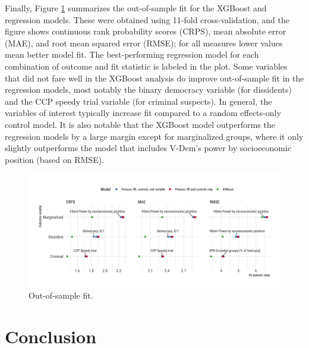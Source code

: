 \documentclass[11pt]{article}
\begin{document}

Finally, Figure \ref{oos-fit} summarizes the out-of-sample fit for the XGBoost and regression models. These were obtained using 11-fold cross-validation, and the figure shows continuous rank probability scores (CRPS), mean absolute error (MAE), and root mean squared error (RMSE); for all measures lower values mean better model fit. The best-performing regression model for each combination of outcome and fit statistic is labeled in the plot. Some variables that did not fare well in the XGBoost analysis do improve out-of-sample fit in the regression models, most notably the binary democracy variable (for dissidents) and the CCP speedy trial variable (for criminal suspects). In general, the variables of interest typically increase fit compared to a random effects-only control model. It is also notable that the XGBoost model outperforms the regression models by a large margin except for marginalized groups, where it only slightly outperforms the model that includes V-Dem's power by socioeconomic position (based on RMSE). 

\begin{figure}
\begin{center}
\caption{Out-of-sample fit.}
\label{oos-fit}
\includegraphics[width=.99\textwidth]{../output/figures/oos-fit-all.png}
\end{center}
\end{figure}

\section*{Conclusion}
\end{document}
